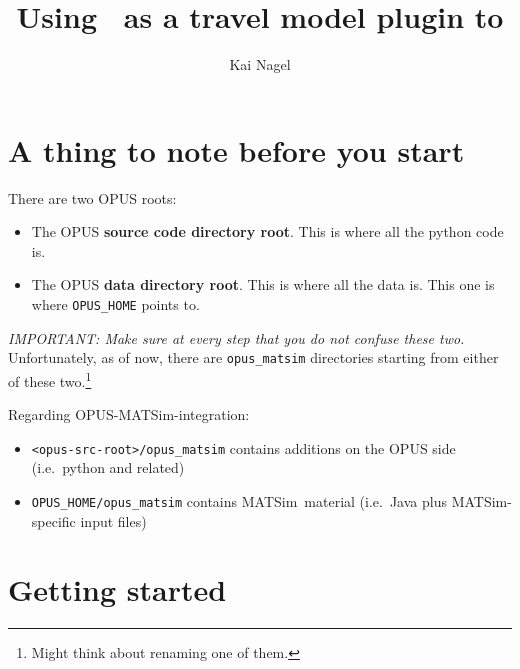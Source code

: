 \documentclass{article}
\title{Using \matsim\ as a travel model plugin to \urbansim}
\author{Kai Nagel}
\def\matsim{MATSim}
\begin{document}

\maketitle

\section{A thing to note before you start}

There are two OPUS roots:
\begin{itemize}

\item The OPUS \textbf{source code directory root}.  This is where all
the python code is.

\item The OPUS \textbf{data directory root}.  This is where all the
data is.  This one is where \verb#OPUS_HOME# points to.

\end{itemize}
\emph{IMPORTANT: Make sure at every step that you do not confuse these
two.}  Unfortunately, as of now, there are \verb$opus_matsim$
directories starting from either of these two.\footnote{%
%
Might think about renaming one of them.
%
}

Regarding OPUS-\matsim-integration:
\begin{itemize}

\item \verb$<opus-src-root>/opus_matsim$ contains additions on the
OPUS side (i.e.\ python and related)

\item \verb$OPUS_HOME/opus_matsim$ contains \matsim\ material (i.e.\
Java plus \matsim-specific input files)

\end{itemize}

\section{Getting started}
\end{document}
